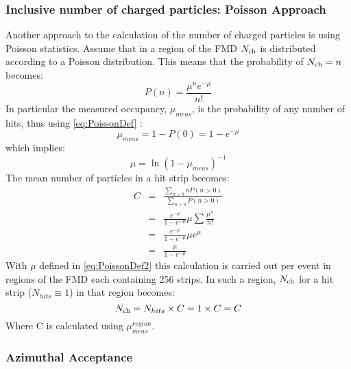 \documentclass[11pt]{article}
\newcommand{\mult}[1][]{\ensuremath N_{\text{ch}#1}}
\begin{document}
\subsubsection{Inclusive number of charged particles: Poisson Approach} 
\label{sec:sub:sub:poisson}
Another approach to the calculation of the number of charged particles
is using Poisson statistics. 
Assume that in a region of the FMD %
$\mult$ 
is
distributed according to a Poisson distribution. This means that the
probability of $\mult=n$ becomes:
\begin{equation}
P(n) = \frac{\mu^n e^{-\mu}}{n!} \label{eq:PoissonDef}
\end{equation}
In particular the measured occupancy, $\mu_{meas}$, is the probability
of any number of hits, thus using \eqref{eq:PoissonDef} :
\begin{equation}
\mu_{meas} = 1 - P(0) = 1 - e^{-\mu } 
\end{equation}
which implies:
\begin{equation}
\mu = \ln
(1 - \mu_{meas})^{-1} \label{eq:PoissonDef2}
\end{equation}
The mean number of particles in a hit strip becomes:
\begin{eqnarray}
C &=& \frac{\sum_{n>0} n P(n>0)}{\sum_{n>0} P(n>0)} \nonumber \\
  &=& \frac{e^{-\mu}}{1-e^{-\mu}} \mu  \sum \frac{\mu^n}{n!} 
  \nonumber \\
  &=& \frac{e^{-\mu}}{1-e^{-\mu}} \mu e^{\mu} \nonumber \\
  &=& \frac{\mu}{1-e^{-\mu}}
\end{eqnarray}
With $\mu$ defined in \eqref{eq:PoissonDef2} this calculation is
carried out per event in
regions of the FMD each containing 256 strips. %
 In such a region,
$\mult$ for a hit strip ($N_{hits} \equiv 1$) in that region becomes:
\begin{equation}
\mult = N_{hits} \times C = 1 \times C = C
\end{equation}
Where C is calculated using $\mu_{meas}^{region}$.

\subsubsection{Azimuthal Acceptance}
\end{document}
